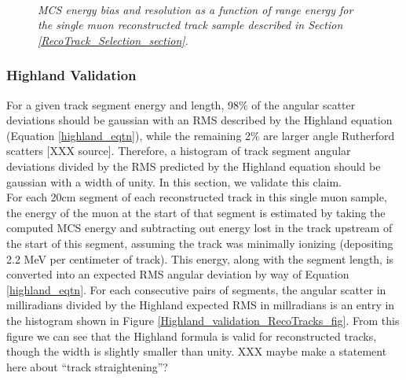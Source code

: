 \begin{figure}
\centering
\mbox{
	\quad
	}
\caption{\textit{MCS energy bias and resolution as a function of range energy for the single muon reconstructed track sample described in Section \ref{RecoTrack_Selection_section}.}}
\label{MCS_range_bias_resolution_RecoTrack_fig}
\end{figure}



\subsubsection{Highland Validation}\label{Highland_Validation_RecoTrack_section}
For a given track segment energy and length, 98\% of the angular scatter deviations should be gaussian with an RMS described by the Highland equation (Equation \ref{highland_eqtn}), while the remaining 2\% are larger angle Rutherford scatters [XXX source]. Therefore, a histogram of track segment angular deviations divided by the RMS predicted by the Highland equation should be gaussian with a width of unity. In this section, we validate this claim.\\

For each 20cm segment of each reconstructed track in this single muon sample, the energy of the muon at the start of that segment is estimated by taking the computed MCS energy and subtracting out energy lost in the track upstream of the start of this segment, assuming the track was minimally ionizing (depositing 2.2 MeV per centimeter of track). This energy, along with the segment length, is converted into an expected RMS angular deviation by way of Equation \ref{highland_eqtn}. For each consecutive pairs of segments, the angular scatter in milliradians divided by the Highland expected RMS in millradians is an entry in the histogram shown in Figure \ref{Highland_validation_RecoTracks_fig}. From this figure we can see that the Highland formula is valid for reconstructed tracks, though the width is slightly smaller than unity. XXX maybe make a statement here about ``track straightening''?

